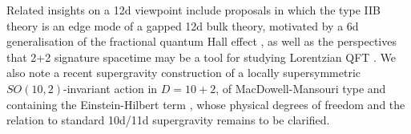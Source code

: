 Related insights on a 12d viewpoint include proposals in which the type IIB theory is an edge mode of a gapped 12d bulk theory, motivated by a 6d generalisation of the fractional quantum Hall effect \cite{Heckman:2017uxe}, as well as the perspectives that 2+2 signature spacetime may be a tool for studying Lorentzian QFT \cite{Heckman:2018mxl,Heckman:2022peq}. 
We also note a recent supergravity construction of a locally supersymmetric $SO(10,2)$-invariant action in $D=10+2$,
of MacDowell-Mansouri type and containing the Einstein-Hilbert term \cite{Castellani:2017vbi}, whose physical degrees of freedom and the relation to standard 10d/11d supergravity remains to be clarified.
